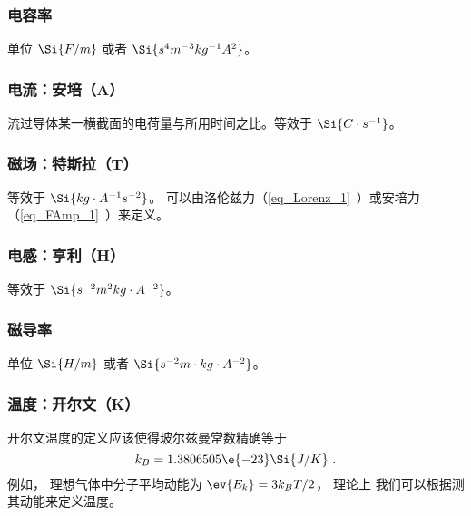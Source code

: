 \subsubsection{电容率}
单位 $\Si{F/m}$ 或者 $\Si{s^4 m^{-3} kg^{-1} A^2}$。

\subsubsection{电流：安培（A）}
流过导体某一横截面的电荷量与所用时间之比。等效于 $\Si{C \cdot s^{-1}}$。

\subsubsection{磁场：特斯拉（T）}
等效于 $\Si{kg\cdot A^{-1}s^{-2}}$。 可以由洛伦兹力（\autoref{eq_Lorenz_1}~）或安培力（\autoref{eq_FAmp_1}~）来定义。

\subsubsection{电感：亨利（H）}
等效于 $\Si{ s^{-2}m^2 kg \cdot A^{-2}}$。

\subsubsection{磁导率}
单位 $\Si{H/m}$ 或者 $\Si{s^{-2} m \cdot kg \cdot A^{-2}}$。

\subsubsection{温度：开尔文（K）}
开尔文温度的定义应该使得玻尔兹曼常数精确等于
\begin{equation}
k_B = 1.3806505\e{-23} \Si{J/K}~.
\end{equation}
例如， 理想气体中分子平均动能为 $\ev{E_k} = 3 k_B T/2$， 理论上 我们可以根据测其动能来定义温度。

